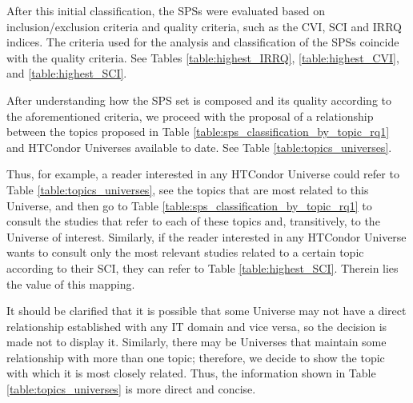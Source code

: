 After this initial classification, the SPSs were evaluated based on inclusion/exclusion criteria and quality criteria, such as the CVI, SCI and IRRQ indices. The criteria used for the analysis and classification of the SPSs coincide with the quality criteria. See Tables \ref{table:highest_IRRQ}, \ref{table:highest_CVI}, and \ref{table:highest_SCI}.

After understanding how the SPS set is composed and its quality according to the aforementioned criteria, we proceed with the proposal of a relationship between the topics proposed in Table \ref{table:sps_classification_by_topic_rq1} and HTCondor Universes available to date. See Table \ref{table:topics_universes}.

Thus, for example, a reader interested in any HTCondor Universe could refer to Table \ref{table:topics_universes}, see the topics that are most related to this Universe, and then go to Table \ref{table:sps_classification_by_topic_rq1} to consult the studies that refer to each of these topics and, transitively, to the Universe of interest. Similarly, if the reader interested in any HTCondor Universe wants to consult only the most relevant studies related to a certain topic according to their SCI, they can refer to Table \ref{table:highest_SCI}. Therein lies the value of this mapping.

It should be clarified that it is possible that some Universe may not have a direct relationship established with any IT domain and vice versa, so the decision is made not to display it. Similarly, there may be Universes that maintain some relationship with more than one topic; therefore, we decide to show the topic with which it is most closely related. Thus, the information shown in Table \ref{table:topics_universes} is more direct and concise.

